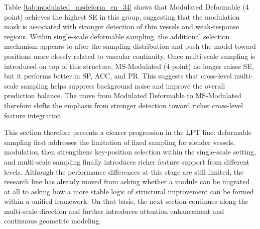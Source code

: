\documentclass[a4paper,11pt]{article}
\begin{document}
\begin{table}[!htbp]
\centering
\caption{Results of Modulated and multi-scale deformable LPT experiments}
\label{tab:modulated_msdeform_en_34}
\end{table}
\FloatBarrier

Table \ref{tab:modulated_msdeform_en_34} shows that Modulated Deformable (4 point) achieves the highest SE in this group, suggesting that the modulation mask is associated with stronger detection of thin vessels and weak-response regions. Within single-scale deformable sampling, the additional selection mechanism appears to alter the sampling distribution and push the model toward positions more closely related to vascular continuity. Once multi-scale sampling is introduced on top of this structure, MS-Modulated (4 point) no longer raises SE, but it performs better in SP, ACC, and PR. This suggests that cross-level multi-scale sampling helps suppress background noise and improve the overall prediction balance. The move from Modulated Deformable to MS-Modulated therefore shifts the emphasis from stronger detection toward richer cross-level feature integration.

This section therefore presents a clearer progression in the LPT line: deformable sampling first addresses the limitation of fixed sampling for slender vessels, modulation then strengthens key-position selection within the single-scale setting, and multi-scale sampling finally introduces richer feature support from different levels. Although the performance differences at this stage are still limited, the research line has already moved from asking whether a module can be migrated at all to asking how a more stable logic of structural improvement can be formed within a unified framework. On that basis, the next section continues along the multi-scale direction and further introduces attention enhancement and continuous geometric modeling.
\end{document}
